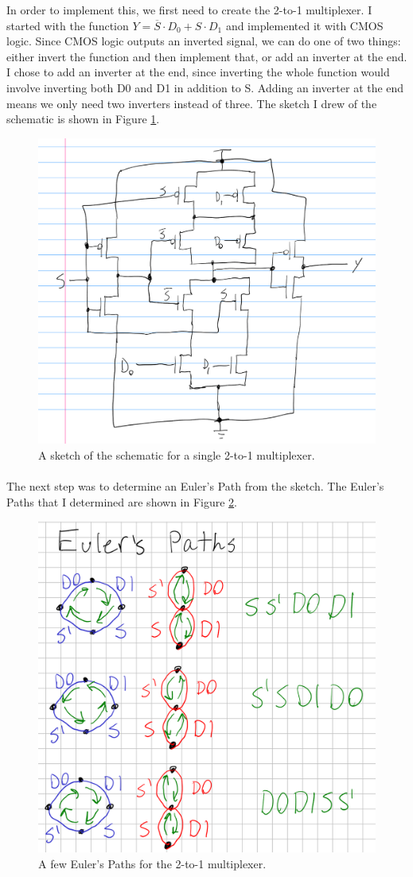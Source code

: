 \documentclass{article}
\begin{document}
  In order to implement this, we first need to create the 2-to-1 multiplexer. I started with the function $Y=\overline{S}\cdot D_0+S\cdot D_1$ and implemented it with CMOS logic. Since CMOS logic outputs an inverted signal, we can do one of two things: either invert the function and then implement that, or add an inverter at the end. I chose to add an inverter at the end, since inverting the whole function would involve inverting both D0 and D1 in addition to S. Adding an inverter at the end means we only need two inverters instead of three. The sketch I drew of the schematic is shown in Figure \ref{fig:21schem}.


  \begin{figure}[H]
    \centering
    \includegraphics[width=0.5\linewidth, frame]{screenshots/21schem.png}
    \caption{A sketch of the schematic for a single 2-to-1 multiplexer.}
    \label{fig:21schem}
  \end{figure}

  \paragraph{}
  The next step was to determine an Euler's Path from the sketch. The Euler's Paths that I determined are shown in Figure \ref{fig:euler}.


  \begin{figure}[H]
    \centering
    \includegraphics[width=0.5\linewidth, frame]{screenshots/euler.png}
    \caption{A few Euler's Paths for the 2-to-1 multiplexer.}
    \label{fig:euler}
  \end{figure}
\end{document}

